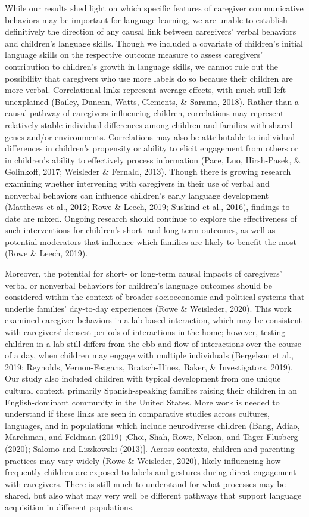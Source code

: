 \documentclass[
  english,
  man,mask]{apa6}
\begin{document}
While our results shed light on which specific features of caregiver communicative behaviors may be important for language learning, we are unable to establish definitively the direction of any causal link between caregivers' verbal behaviors and children's language skills. Though we included a covariate of children's initial language skills on the respective outcome measure to assess caregivers' contribution to children's growth in language skills, we cannot rule out the possibility that caregivers who use more labels do so because their children are more verbal. Correlational links represent average effects, with much still left unexplained (Bailey, Duncan, Watts, Clements, \& Sarama, 2018). Rather than a causal pathway of caregivers influencing children, correlations may represent relatively stable individual differences among children and families with shared genes and/or environments. Correlations may also be attributable to individual differences in children's propensity or ability to elicit engagement from others or in children's ability to effectively process information (Pace, Luo, Hirsh-Pasek, \& Golinkoff, 2017; Weisleder \& Fernald, 2013). Though there is growing research examining whether intervening with caregivers in their use of verbal and nonverbal behaviors can influence children's early language development (Matthews et al., 2012; Rowe \& Leech, 2019; Suskind et al., 2016), findings to date are mixed. Ongoing research should continue to explore the effectiveness of such interventions for children's short- and long-term outcomes, as well as potential moderators that influence which families are likely to benefit the most (Rowe \& Leech, 2019).

Moreover, the potential for short- or long-term causal impacts of caregivers' verbal or nonverbal behaviors for children's language outcomes should be considered within the context of broader socioeconomic and political systems that underlie families' day-to-day experiences (Rowe \& Weisleder, 2020). This work examined caregiver behaviors in a lab-based interaction, which may be consistent with caregivers' densest periods of interactions in the home; however, testing children in a lab still differs from the ebb and flow of interactions over the course of a day, when children may engage with multiple individuals (Bergelson et al., 2019; Reynolds, Vernon-Feagans, Bratsch-Hines, Baker, \& Investigators, 2019). Our study also included children with typical development from one unique cultural context, primarily Spanish-speaking families raising their children in an English-dominant community in the United States. More work is needed to understand if these links are seen in comparative studies across cultures, languages, and in populations which include neurodiverse children (Bang, Adiao, Marchman, and Feldman (2019) ;Choi, Shah, Rowe, Nelson, and Tager-Flusberg (2020); Salomo and Liszkowski (2013){]}. Across contexts, children and parenting practices may vary widely (Rowe \& Weisleder, 2020), likely influencing how frequently children are exposed to labels and gestures during direct engagement with caregivers. There is still much to understand for what processes may be shared, but also what may very well be different pathways that support language acquisition in different populations.
\end{document}
